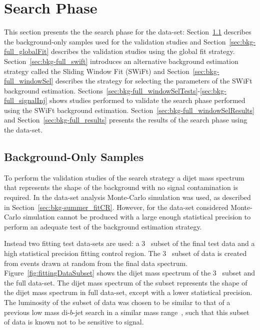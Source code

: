 \clearpage
\section{\lm{} Search Phase}
\label{sec:bkg-full}

This section presents the the search phase for the \lm{} data-set:
Section~\ref{sec:bkg-full_fitCR} describes the background-only samples used for the validation studies and
Section~\ref{sec:bkg-full_globalFit} describes the validation studies using the global fit strategy.
Section~\ref{sec:bkg-full_swift} introduces an alternative background estimation strategy called the Sliding Window Fit (SWiFt)
and Section~\ref{sec:bkg-full_windowSel} describes the strategy for selecting the parameters of the SWiFt background estimation.
Sections~\ref{sec:bkg-full_windowSelTests}-\ref{sec:bkg-full_signalInj} shows studies performed to validate the search phase performed using the SWiFt background estimation.
Section~\ref{sec:bkg-full_windowSelResults} and Section~\ref{sec:bkg-full_results} presents the results of the search phase using the \lm{} data-set.

\subsection{Background-Only Samples}
\label{sec:bkg-full_fitCR}


To perform the validation studies of the \lm{} search strategy
a dijet mass spectrum that represents the shape of the background with no signal contamination is required.
In the \summer{} data-set analysis Monte-Carlo simulation was used,
as described in Section~\ref{sec:bkg-summer_fitCR}.
However, for the \lm{} data-set considered Monte-Carlo simulation cannot be produced with a large enough statistical
precision to perform an adequate test of the background estimation strategy.

Instead two fitting test data-sets are used:
a 3~\ifb{} subset of the final test data and a high statistical precision fitting control region.
The 3~\ifb{} subset of data is created from events drawn at random from the final data spectrum.
Figure~\ref{fig:fittingDataSubset} shows the dijet mass spectrum of the 3~\ifb{} subset and the full \lm{} data-set.
The dijet mass spectrum of the subset represents the shape of the dijet mass spectrum in full data-set,
except with a lower statistical precision.
The luminosity of the subset of data was chosen to be similar to that of a
previous low mass di-$b$-jet search in a similar mass range~\cite{dibjet-lhcp_conf},
such that this subset of data is known not to be sensitive to signal.

